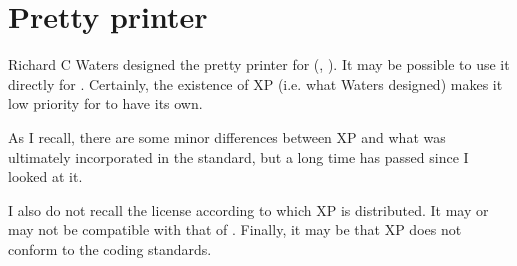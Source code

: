 \chapter{Pretty printer}

Richard C Waters designed the pretty printer for
\commonlisp{} (\cite{Waters89xp:a}, \cite{Waters:1992:UNC:1039991.1039996}).
It may be possible to use it directly for \sysname{}.  Certainly, the
existence of XP (i.e. what Waters designed) makes it low priority for
\sysname{} to have its own. 

As I recall, there are some minor differences between XP and what was
ultimately incorporated in the standard, but a long time has passed
since I looked at it.

I also do not recall the license according to which XP is distributed.
It may or may not be compatible with that of \sysname{}.  Finally, it
may be that XP does not conform to the \sysname{} coding standards.



